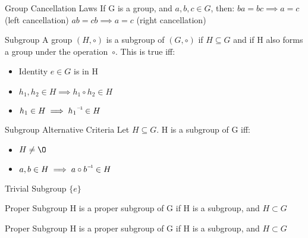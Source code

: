 \begin{flashcard}[Definition]{Group Cancellation Laws}
  If G is a group, and $a,b,c \in G$, then:
  \vfill
  $ba = bc \implies a = c$ (left cancellation)
  \vfill
  $ab = cb \implies a = c$ (right cancellation)
\end{flashcard}

\begin{flashcard}[Definition]{Subgroup}
  A group $(H, \circ)$ is a subgroup of $(G, \circ)$ if $H \subseteq G$ and if H also forms a group under the operation~$\circ$. This is true iff:
  \vfill
  \begin{itemize}
   \item Identity $e \in G$ is in H
   \item $h_1,h_2 \in H \implies h_1 \circ h_2 \in H$
   \item $h_1 \in H \implies \inv{h_1} \in H$
  \end{itemize}
\end{flashcard}

\begin{flashcard}[Definition]{Subgroup Alternative Criteria}
  Let $H \subseteq G$. H is a subgroup of G iff:
  \vfill
  \begin{itemize}
   \item $H \neq \O$
   \item $a,b \in H \implies a \circ \inv{b} \in H$
  \end{itemize}
\end{flashcard}

\begin{flashcard}[Definition]{Trivial Subgroup}
  $\{e\}$
\end{flashcard}

\begin{flashcard}[Definition]{Proper Subgroup}
  H is a proper subgroup of G if H is a subgroup, and $H \subset G$
\end{flashcard}

\begin{flashcard}[Definition]{Proper Subgroup}
  H is a proper subgroup of G if H is a subgroup, and $H \subset G$
\end{flashcard}
